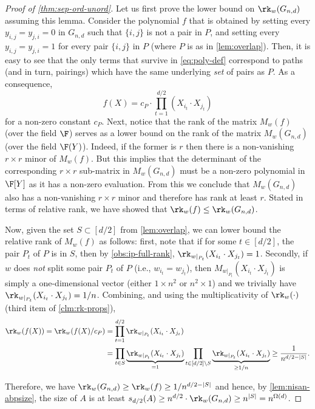 \documentclass{article}
\begin{document}
\begin{proof}[Proof of \autoref{thm:sep-ord-unord}]
    Let us first prove the lower bound on $\rk_w(G_{n,d})$ assuming this lemma. 
    Consider the polynomial $f$ that is obtained by setting every $y_{i,j} = y_{j,i} = 0$ in $G_{n,d}$ such that $\{i,j\}$ is not a pair in $P$, and setting every $y_{i,j} = y_{j,i} = 1$ for every pair $\{i,j\}$ in $P$ (where $P$ is as in \autoref{lem:overlap}). 
    Then, it is easy to see that the only terms that survive in \autoref{eq:poly-def} correspond to paths (and in turn, pairings) which have the same underlying \emph{set} of pairs as $P$. 
    As a consequence,
    \[
        f(X)= c_P \cdot \prod_{t = 1}^{d/2} (X_{i_t}\cdot X_{j_t})
    \]
    for a non-zero constant $c_P$.
    Next, notice that the rank of the matrix $M_w(f)$ (over the field $\F$) serves as a lower bound on the rank of the matrix $M_w(G_{n,d})$ (over the field $\F(Y)$).
    Indeed, if the former is $r$ then there is a non-vanishing $r\times r$ minor of $M_w(f)$. 
    But this implies that the determinant of the corresponding $r\times r$ sub-matrix in $M_w(G_{n,d})$ must be a non-zero polynomial in $\F[Y]$ as it has a non-zero evaluation.
    From this we conclude that $M_w(G_{n,d})$ also has a non-vanishing $r\times r$ minor and therefore has rank at least $r$. 
    Stated in terms of relative rank, we have showed that $\rk_w(f)\leq \rk_w(G_{n,d})$.

    Now, given the set $S\subset [d/2]$ from \autoref{lem:overlap}, we can lower bound the relative rank of $M_w(f)$ as follows: first, note that if for some $t\in[d/2]$, the pair $P_t$ of $P$ is in $S$, then by \autoref{obs:ip-full-rank}, $\rk_{w|_{P_t}}(X_{i_t}\cdot X_{j_t}) = 1$. 
    Secondly, if $w$ does \emph{not} split some pair $P_t$ of $P$ (i.e., $w_{i_t} = w_{j_t}$), then $M_{w|_{P_t}}(X_{i_t}\cdot X_{j_t})$ is simply a one-dimensional vector (either $1\times n^2$ or $n^2\times 1$) and we trivially have $\rk_{w|_{P_t}}(X_{i_t}\cdot X_{j_t}) = 1/n$. 
    Combining, and using the multiplicativity of $\rk_w(\cdot)$ (third item of \autoref{clm:rk-props}), 
    \begin{align*}
        \rk_w(f(X)) = \rk_w(f(X)/c_P) &= \prod_{t = 1}^{d/2} \rk_{w|_{P_t}}(X_{i_t}\cdot X_{j_t})\\
        &= \prod_{t\in S} \underbrace{\rk_{w|_{P_t}}(X_{i_t}\cdot X_{j_t})}_{= 1} \prod_{t\in[d/2]\setminus S}\underbrace{\rk_{w|_{P_t}}(X_{i_t}\cdot X_{j_t})}_{\geq 1/n}
        \geq \frac{1}{n^{d/2 - |S|}}.
    \end{align*}
    
    Therefore, we have $\rk_w(G_{n,d})\geq \rk_w(f) \geq 1/n^{d/2 - |S|}$ and hence, by \autoref{lem:nisan-abpsize}, the size of $A$ is at least $s_{d/2}(A)\geq n^{d/2}\cdot \rk_w(G_{n,d}) \geq n^{|S|} = n^{\Omega(d)}$.
\end{proof}
\end{document}

